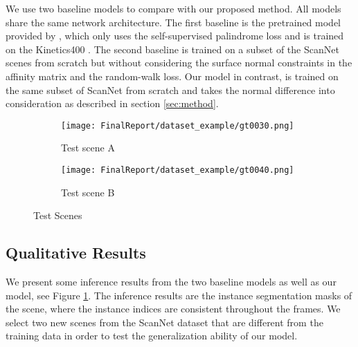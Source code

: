 \par {} We use two baseline models to compare with our proposed method. All models share the same network architecture. The first baseline is the pretrained model provided by \cite{jabri2020walk}, which only uses the self-supervised palindrome loss and is trained on the Kinetics400 \cite{carreira2017quo}. The second baseline is trained on a subset of the ScanNet scenes from scratch but without considering the surface normal constraints in the affinity matrix and the random-walk loss. Our model in contrast, is trained on the same subset of ScanNet from scratch and takes the normal difference into consideration as described in section \ref{sec:method}.

\begin{figure}[H]
  \centering
  \begin{subfigure}[b]{0.85\columnwidth}
    \texttt{[image: FinalReport/dataset\_example/gt0030.png]}
    \caption{Test scene A}
  \end{subfigure}
  \begin{subfigure}[b]{0.85\columnwidth}
    \texttt{[image: FinalReport/dataset\_example/gt0040.png]}
    \caption{Test scene B}
  \end{subfigure}
  \vspace{-0.1in}
  \caption{Test Scenes}
    \vspace{-0.3in}
  \label{fig:video_seg}
\end{figure}

\vspace{-0.05in}

\subsection{Qualitative Results}

We present some inference results from the two baseline models as well as our model, see Figure \ref{fig:video_seg}. The inference results are the instance segmentation masks of the scene, where the instance indices are consistent throughout the frames. We select two new scenes from the ScanNet dataset that are different from the training data in order to test the generalization ability of our model. 


